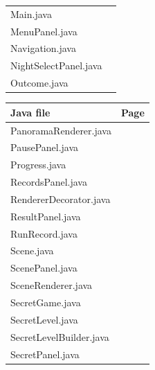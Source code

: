 \documentclass[11pt,a4paper]{article}
\begin{document}
\begin{minipage}[t]{.485\linewidth}
\begin{tabularx}{\linewidth}{Xr}
Main.java&\hyperref[file:Main]{\pageref*{file:Main}}\\
MenuPanel.java&\hyperref[file:MenuPanel]{\pageref*{file:MenuPanel}}\\
Navigation.java&\hyperref[file:Navigation]{\pageref*{file:Navigation}}\\
NightSelectPanel.java&\hyperref[file:NightSelectPanel]{\pageref*{file:NightSelectPanel}}\\
Outcome.java&\hyperref[file:Outcome]{\pageref*{file:Outcome}}\\
\bottomrule\end{tabularx}\par\end{minipage}\hfill\begin{minipage}[t]{.485\linewidth}\small\par\noindent\begin{tabularx}{\linewidth}{Xr}\toprule\textbf{Java file}&\textbf{Page}\\\midrule
PanoramaRenderer.java&\hyperref[file:PanoramaRenderer]{\pageref*{file:PanoramaRenderer}}\\
PausePanel.java&\hyperref[file:PausePanel]{\pageref*{file:PausePanel}}\\
Progress.java&\hyperref[file:Progress]{\pageref*{file:Progress}}\\
RecordsPanel.java&\hyperref[file:RecordsPanel]{\pageref*{file:RecordsPanel}}\\
RendererDecorator.java&\hyperref[file:RendererDecorator]{\pageref*{file:RendererDecorator}}\\
ResultPanel.java&\hyperref[file:ResultPanel]{\pageref*{file:ResultPanel}}\\
RunRecord.java&\hyperref[file:RunRecord]{\pageref*{file:RunRecord}}\\
Scene.java&\hyperref[file:Scene]{\pageref*{file:Scene}}\\
ScenePanel.java&\hyperref[file:ScenePanel]{\pageref*{file:ScenePanel}}\\
SceneRenderer.java&\hyperref[file:SceneRenderer]{\pageref*{file:SceneRenderer}}\\
SecretGame.java&\hyperref[file:SecretGame]{\pageref*{file:SecretGame}}\\
SecretLevel.java&\hyperref[file:SecretLevel]{\pageref*{file:SecretLevel}}\\
SecretLevelBuilder.java&\hyperref[file:SecretLevelBuilder]{\pageref*{file:SecretLevelBuilder}}\\
SecretPanel.java&\hyperref[file:SecretPanel]{\pageref*{file:SecretPanel}}\\

\end{tabularx}
\end{minipage}
\end{document}
